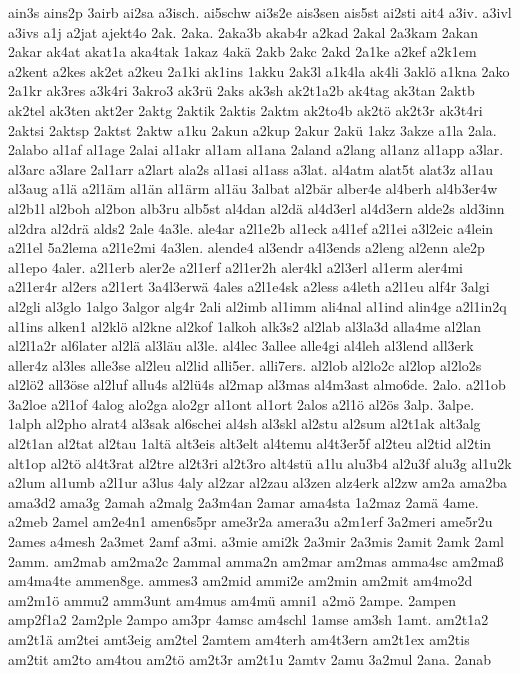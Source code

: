 {ain3s
ains2p
3airb
ai2sa
a3isch.
ai5schw
ai3s2e
ais3sen
ais5st
ai2sti
ait4
a3iv.
a3ivl
a3ivs
a1j
a2jat
ajekt4o
2ak.
2aka.
2aka3b
akab4r
a2kad
2akal
2a3kam
2akan
2akar
ak4at
akat1a
aka4tak
1akaz
4akä
2akb
2akc
2akd
2a1ke
a2kef
a2k1em
a2kent
a2kes
ak2et
a2keu
2a1ki
ak1ins
1akku
2ak3l
a1k4la
ak4li
3aklö
a1kna
2ako
2a1kr
ak3res
a3k4ri
3akro3
ak3rü
2aks
ak3sh
ak2t1a2b
ak4tag
ak3tan
2aktb
ak2tel
ak3ten
akt2er
2aktg
2aktik
2aktis
2aktm
ak2to4b
ak2tö
ak2t3r
ak3t4ri
2aktsi
2aktsp
2aktst
2aktw
a1ku
2akun
a2kup
2akur
2akü
1akz
3akze
a1la
2ala.
2alabo
al1af
al1age
2alai
al1akr
al1am
al1ana
2aland
a2lang
al1anz
al1app
a3lar.
al3arc
a3lare
2al1arr
a2lart
ala2s
al1asi
al1ass
a3lat.
al4atm
alat5t
alat3z
al1au
al3aug
a1lä
a2l1äm
al1än
al1ärm
al1äu
3albat
al2bär
alber4e
al4berh
al4b3er4w
al2b1l
al2boh
al2bon
alb3ru
alb5st
al4dan
al2dä
al4d3erl
al4d3ern
alde2s
ald3inn
al2dra
al2drä
alds2
2ale
4a3le.
ale4ar
a2l1e2b
al1eck
a4l1ef
a2l1ei
a3l2eic
a4lein
a2l1el
5a2lema
a2l1e2mi
4a3len.
alende4
al3endr
a4l3ends
a2leng
al2enn
ale2p
al1epo
4aler.
a2l1erb
aler2e
a2l1erf
a2l1er2h
aler4kl
a2l3erl
al1erm
aler4mi
a2l1er4r
al2ers
a2l1ert
3a4l3erwä
4ales
a2l1e4sk
a2less
a4leth
a2l1eu
alf4r
3algi
al2gli
al3glo
1algo
3algor
alg4r
2ali
al2imb
al1imm
ali4nal
al1ind
alin4ge
a2l1in2q
al1ins
alken1
al2klö
al2kne
al2kof
1alkoh
alk3s2
al2lab
al3la3d
alla4me
al2lan
al2l1a2r
al6later
al2lä
al3läu
al3le.
al4lec
3allee
alle4gi
al4leh
al3lend
all3erk
aller4z
al3les
alle3se
al2leu
al2lid
alli5er.
alli7ers.
al2lob
al2lo2c
al2lop
al2lo2s
al2lö2
all3öse
al2luf
allu4s
al2lü4s
al2map
al3mas
al4m3ast
almo6de.
2alo.
a2l1ob
3a2loe
a2l1of
4alog
alo2ga
alo2gr
al1ont
al1ort
2alos
a2l1ö
al2ös
3alp.
3alpe.
1alph
al2pho
alrat4
al3sak
al6schei
al4sh
al3skl
al2stu
al2sum
al2t1ak
alt3alg
al2t1an
al2tat
al2tau
1altä
alt3eis
alt3elt
al4temu
al4t3er5f
al2teu
al2tid
al2tin
alt1op
al2tö
al4t3rat
al2tre
al2t3ri
al2t3ro
alt4stü
a1lu
alu3b4
al2u3f
alu3g
al1u2k
a2lum
al1umb
a2l1ur
a3lus
4aly
al2zar
al2zau
al3zen
alz4erk
al2zw
am2a
ama2ba
ama3d2
ama3g
2amah
a2malg
2a3m4an
2amar
ama4sta
1a2maz
2amä
4ame.
a2meb
2amel
am2e4n1
amen6s5pr
ame3r2a
amera3u
a2m1erf
3a2meri
ame5r2u
2ames
a4mesh
2a3met
2amf
a3mi.
a3mie
ami2k
2a3mir
2a3mis
2amit
2amk
2aml
2amm.
am2mab
am2ma2c
2ammal
amma2n
am2mar
am2mas
amma4sc
am2maß
am4ma4te
ammen8ge.
ammes3
am2mid
ammi2e
am2min
am2mit
am4mo2d
am2m1ö
ammu2
amm3unt
am4mus
am4mü
amni1
a2mö
2ampe.
2ampen
amp2f1a2
2am2ple
2ampo
am3pr
4amsc
am4schl
1amse
am3sh
1amt.
am2t1a2
am2t1ä
am2tei
amt3eig
am2tel
2amtem
am4terh
am4t3ern
am2t1ex
am2tis
am2tit
am2to
am4tou
am2tö
am2t3r
am2t1u
2amtv
2amu
3a2mul
2ana.
2anab
}
